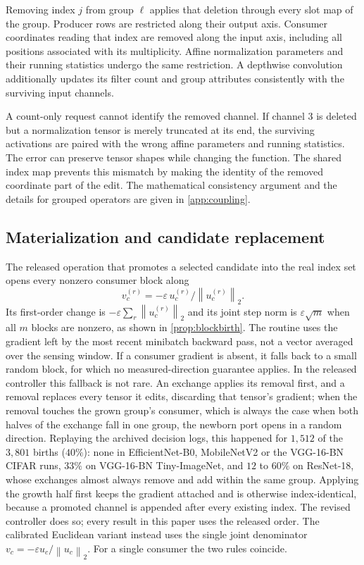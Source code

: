 \documentclass[10pt]{article}
\theoremstyle{paper}
\newcommand{\norm}[1]{\left\lVert #1\right\rVert}
\begin{document}
Removing index $j$ from group $\ell$ applies that deletion through every slot map of the group. Producer rows are restricted along their output axis. Consumer coordinates reading that index are removed along the input axis, including all positions associated with its multiplicity. Affine normalization parameters and their running statistics undergo the same restriction. A depthwise convolution additionally updates its filter count and group attributes consistently with the surviving input channels.

A count-only request cannot identify the removed channel. If channel 3 is deleted but a normalization tensor is merely truncated at its end, the surviving activations are paired with the wrong affine parameters and running statistics. The error can preserve tensor shapes while changing the function. The shared index map prevents this mismatch by making the identity of the removed coordinate part of the edit. The mathematical consistency argument and the details for grouped operators are given in \cref{app:coupling}.

\subsection{Materialization and candidate replacement}
\label{app:materialization}
The released operation that promotes a selected candidate into the real index set opens every nonzero consumer block along
\begin{equation}
v_c^{(r)}=-\varepsilon\,u_c^{(r)}/\norm{u_c^{(r)}}_2.
\label{eq:materialize}
\end{equation}
Its first-order change is $-\varepsilon\sum_r\norm{u_c^{(r)}}_2$ and its joint step norm is $\varepsilon\sqrt{m}$ when all $m$ blocks are nonzero, as shown in \cref{prop:blockbirth}. The routine uses the gradient left by the most recent minibatch backward pass, not a vector averaged over the sensing window. If a consumer gradient is absent, it falls back to a small random block, for which no measured-direction guarantee applies. In the released controller this fallback is not rare. An exchange applies its removal first, and a removal replaces every tensor it edits, discarding that tensor's gradient; when the removal touches the grown group's consumer, which is always the case when both halves of the exchange fall in one group, the newborn port opens in a random direction. Replaying the archived decision logs, this happened for $1{,}512$ of the $3{,}801$ births ($40\%$): none in EfficientNet-B0, MobileNetV2 or the VGG-16-BN CIFAR runs, $33\%$ on VGG-16-BN Tiny-ImageNet, and $12$ to $60\%$ on ResNet-18, whose exchanges almost always remove and add within the same group. Applying the growth half first keeps the gradient attached and is otherwise index-identical, because a promoted channel is appended after every existing index. The revised controller does so; every result in this paper uses the released order. The calibrated Euclidean variant instead uses the single joint denominator $v_c=-\varepsilon u_c/\norm{u_c}_2$. For a single consumer the two rules coincide.
\end{document}
